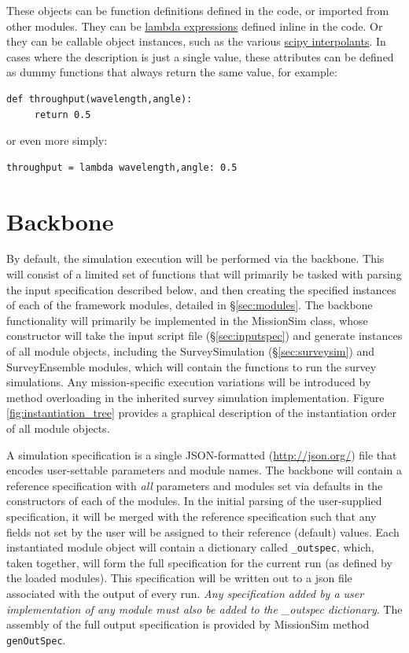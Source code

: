 \documentclass[cleanfoot]{asme2ej}
\newcommand{\reffig}[1]{Figure \ref{#1}}
\begin{document}
These objects can be function definitions defined in the code, or imported from other modules.  They can be \href{https://docs.python.org/2/reference/expressions.html#lambda}{lambda expressions} defined inline in the code.  Or they can be callable object instances, such as the various \href{http://docs.scipy.org/doc/scipy/reference/interpolate.html}{scipy interpolants}.  In cases where the description is just a single value, these attributes can be defined as dummy functions that always return the same value, for example:
\begin{verbatim}
def throughput(wavelength,angle):
     return 0.5
\end{verbatim}
or even more simply:
\begin{verbatim}
throughput = lambda wavelength,angle: 0.5
\end{verbatim}

\section{Backbone}
By default, the simulation execution will be performed via the backbone.  This will consist of a limited set of functions that will primarily be tasked with parsing the input specification described below, and then creating the specified instances of each of the framework modules, detailed in \S\ref{sec:modules}.  The backbone functionality will primarily be implemented in the \mbox{MissionSim} class, whose constructor will take the input script file (\S\ref{sec:inputspec}) and generate instances of all module objects, including the SurveySimulation (\S\ref{sec:surveysim}) and SurveyEnsemble modules, which will contain the functions to run the survey simulations. Any mission-specific execution variations will be introduced by method overloading in the inherited survey simulation implementation. \reffig{fig:instantiation_tree} provides a graphical description of the instantiation order of all module objects.


A simulation specification is a single JSON-formatted (\url{http://json.org/}) file that encodes user-settable parameters and module names.  The backbone will contain a reference specification with \emph{all} parameters and modules set via defaults in the constructors of each of the modules.  In the initial parsing of the user-supplied specification, it will be merged with the reference specification such that any fields not set by the user will be assigned to their reference (default) values.   Each instantiated module object will contain a dictionary called \verb+_outspec+, which, taken together, will form the full specification for the current run (as defined by the loaded modules).  This specification will be written out to a json file associated with the output of every run.  \emph{Any specification added by a user implementation of any module must also be added to the \_outspec dictionary}.  The assembly of the full output specification is provided by MissionSim method \verb+genOutSpec+.
\end{document}
